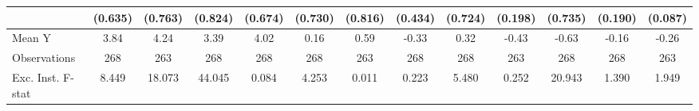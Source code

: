 {\begin{tabular}{l*{12}{c}}
            &     (0.635)         &     (0.763)         &     (0.824)         &     (0.674)         &     (0.730)         &     (0.816)         &     (0.434)         &     (0.724)         &     (0.198)         &     (0.735)         &     (0.190)         &     (0.087)         \\
\midrule
Mean Y      &        3.84         &        4.24         &        3.39         &        4.02         &        0.16         &        0.59         &       -0.33         &        0.32         &       -0.43         &       -0.63         &       -0.16         &       -0.26         \\
Observations&         268         &         263         &         268         &         268         &         268         &         263         &         268         &         268         &         263         &         268         &         268         &         263         \\
Exc. Inst. F-stat&       8.449         &      18.073         &      44.045         &       0.084         &       4.253         &       0.011         &       0.223         &       5.480         &       0.252         &      20.943         &       1.390         &       1.949         \\
\bottomrule
\end{tabular}
}
